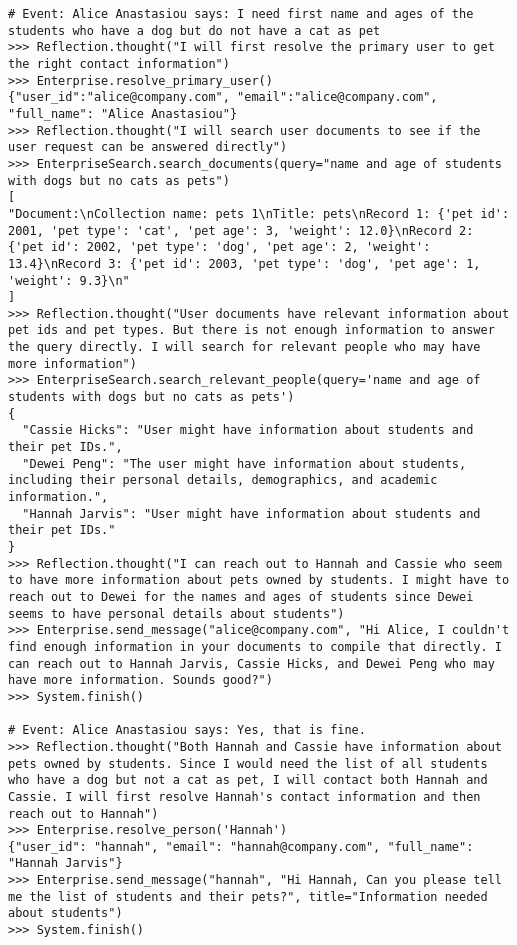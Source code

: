 \begin{lstlisting}[breaklines=true, caption={An annotated exemplar in the question answering domain, with received messages, tool calls, and observations.}, label={lst:exemplar}]
# Event: Alice Anastasiou says: I need first name and ages of the students who have a dog but do not have a cat as pet
>>> Reflection.thought("I will first resolve the primary user to get the right contact information")
>>> Enterprise.resolve_primary_user()
{"user_id":"alice@company.com", "email":"alice@company.com", "full_name": "Alice Anastasiou"}
>>> Reflection.thought("I will search user documents to see if the user request can be answered directly")
>>> EnterpriseSearch.search_documents(query="name and age of students with dogs but no cats as pets")
[
"Document:\nCollection name: pets 1\nTitle: pets\nRecord 1: {'pet id': 2001, 'pet type': 'cat', 'pet age': 3, 'weight': 12.0}\nRecord 2: {'pet id': 2002, 'pet type': 'dog', 'pet age': 2, 'weight': 13.4}\nRecord 3: {'pet id': 2003, 'pet type': 'dog', 'pet age': 1, 'weight': 9.3}\n"
]
>>> Reflection.thought("User documents have relevant information about pet ids and pet types. But there is not enough information to answer the query directly. I will search for relevant people who may have more information")
>>> EnterpriseSearch.search_relevant_people(query='name and age of students with dogs but no cats as pets')
{
  "Cassie Hicks": "User might have information about students and their pet IDs.",
  "Dewei Peng": "The user might have information about students, including their personal details, demographics, and academic information.",
  "Hannah Jarvis": "User might have information about students and their pet IDs."
}
>>> Reflection.thought("I can reach out to Hannah and Cassie who seem to have more information about pets owned by students. I might have to reach out to Dewei for the names and ages of students since Dewei seems to have personal details about students")
>>> Enterprise.send_message("alice@company.com", "Hi Alice, I couldn't find enough information in your documents to compile that directly. I can reach out to Hannah Jarvis, Cassie Hicks, and Dewei Peng who may have more information. Sounds good?")
>>> System.finish()

# Event: Alice Anastasiou says: Yes, that is fine.
>>> Reflection.thought("Both Hannah and Cassie have information about pets owned by students. Since I would need the list of all students who have a dog but not a cat as pet, I will contact both Hannah and Cassie. I will first resolve Hannah's contact information and then reach out to Hannah")
>>> Enterprise.resolve_person('Hannah')
{"user_id": "hannah", "email": "hannah@company.com", "full_name": "Hannah Jarvis"}
>>> Enterprise.send_message("hannah", "Hi Hannah, Can you please tell me the list of students and their pets?", title="Information needed about students")
>>> System.finish()


\end{lstlisting}
